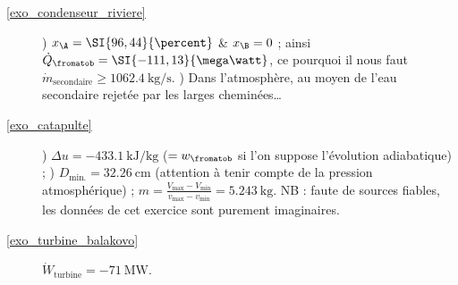 \begin{description}
	\item [\ref{exo_condenseur_riviere}]
			) $x_\A = \SI{96,44}{\percent}$ \& $x_\B = 0$ ; ainsi $\dot Q_\fromatob = \SI{-111,13}{\mega\watt}$, ce pourquoi il nous faut $\dot{m}_\text{secondaire} \geq \SI{1062,4}{\kilogram\per\second}$.
			) Dans l’atmosphère, au moyen de l’eau secondaire rejetée par les larges cheminées…
	\item [\ref{exo_catapulte}]
			) $\Delta u = \SI{-433,1}{\kilo\joule\per\kilogram}$ ($=w_\fromatob$ si l’on suppose l’évolution adiabatique) ;
			) $D_\text{min.} = \SI{32,26}{\centi\metre}$ (attention à tenir compte de la pression atmosphérique) ; $m = \frac{V_\text{max} - V_\text{min}}{v_\text{max} - v_\text{min}} = \SI{5,243}{\kilogram}$.
			\tab NB : faute de sources fiables, les données de cet exercice sont purement imaginaires.
	\item [\ref{exo_turbine_balakovo}] \tab $\dot{W}_\text{turbine} = \SI{-71}{\mega\watt}$.
\end{description}
